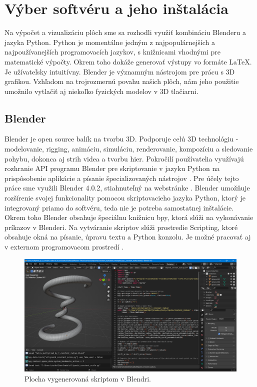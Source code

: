 \section{Výber softvéru a jeho inštalácia}
Na výpočet a vizualizáciu plôch sme sa rozhodli využiť kombináciu Blenderu a jazyka Python. Python je momentálne jedným z najpopulárnejších a najpoužívanejších programovacích jazykov, s knižnicami vhodnými pre matematické výpočty. Okrem toho dokáže generovať výstupy vo formáte \LaTeX. Je užívateľsky intuitívny. Blender je významným nástrojom pre prácu s 3D grafikou. Vzhľadom na trojrozmernú povahu našich plôch, nám jeho použitie umožnilo vytlačiť aj niekoľko fyzických modelov v 3D tlačiarni.
\subsection{Blender}
Blender je open source balík na tvorbu 3D. Podporuje celú 3D technológiu - modelovanie, rigging, animáciu, simuláciu, renderovanie, kompozíciu a sledovanie pohybu, dokonca aj strih videa a tvorbu hier. Pokročilí používatelia využívajú rozhranie API programu Blender pre skriptovanie v jazyku Python na prispôsobenie aplikácie a písanie špecializovaných nástrojov \cite{Blender}. Pre účely tejto práce sme využili Blender 4.0.2, stiahnuteľný na webstránke \cite{BlenderDownload}. Blender umožňuje rozšírenie svojej funkcionality pomocou skriptovacieho jazyka Python, ktorý je integrovaný priamo do softvéru, teda nie je potreba samostatnej inštalácie. Okrem toho Blender obsahuje špeciálnu knižnicu bpy, ktorá slúži na vykonávanie príkazov v Blenderi. Na vytváranie skriptov slúži prostredie Scripting, ktoré obsahuje okná na písanie, úpravu textu a Python konzolu. Je možné pracovať aj v externom programovacom prostredí \cite{BlenderAPI}.

\begin{figure}[h!]
	\centering
	\includegraphics[width=\textwidth]{images/blender.png}
	\caption[Softvér Blender.]{Plocha vygenerovaná skriptom v Blendri.}
	\label{fig:blender}
\end{figure}

